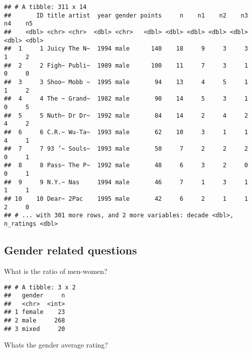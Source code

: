 \documentclass[
]{article}
\newenvironment{Shaded}{\begin{snugshade}}{\end{snugshade}}
\newcommand{\DataTypeTok}[1]{\textcolor[rgb]{0.13,0.29,0.53}{#1}}
\newcommand{\KeywordTok}[1]{\textcolor[rgb]{0.13,0.29,0.53}{\textbf{#1}}}
\newcommand{\NormalTok}[1]{#1}
\newcommand{\OperatorTok}[1]{\textcolor[rgb]{0.81,0.36,0.00}{\textbf{#1}}}
\newcommand{\StringTok}[1]{\textcolor[rgb]{0.31,0.60,0.02}{#1}}
\begin{document}
\begin{verbatim}
## # A tibble: 311 x 14
##       ID title artist  year gender points     n    n1    n2    n3    n4    n5
##    <dbl> <chr> <chr>  <dbl> <chr>   <dbl> <dbl> <dbl> <dbl> <dbl> <dbl> <dbl>
##  1     1 Juicy The N~  1994 male      140    18     9     3     3     1     2
##  2     2 Figh~ Publi~  1989 male      100    11     7     3     1     0     0
##  3     3 Shoo~ Mobb ~  1995 male       94    13     4     5     1     1     2
##  4     4 The ~ Grand~  1982 male       90    14     5     3     1     0     5
##  5     5 Nuth~ Dr Dr~  1992 male       84    14     2     4     2     4     2
##  6     6 C.R.~ Wu-Ta~  1993 male       62    10     3     1     1     4     1
##  7     7 93 ’~ Souls~  1993 male       50     7     2     2     2     0     1
##  8     8 Pass~ The P~  1992 male       48     6     3     2     0     0     1
##  9     9 N.Y.~ Nas     1994 male       46     7     1     3     1     1     1
## 10    10 Dear~ 2Pac    1995 male       42     6     2     1     1     2     0
## # ... with 301 more rows, and 2 more variables: decade <dbl>, n_ratings <dbl>
\end{verbatim}

\hypertarget{gender-related-questions}{%
\subsection{Gender related questions}\label{gender-related-questions}}

What is the ratio of men-women?

\begin{Shaded}
\end{Shaded}

\begin{verbatim}
## # A tibble: 3 x 2
##   gender     n
##   <chr>  <int>
## 1 female    23
## 2 male     268
## 3 mixed     20
\end{verbatim}

Whats the gender average rating?

\begin{Shaded}
\end{Shaded}
\end{document}
